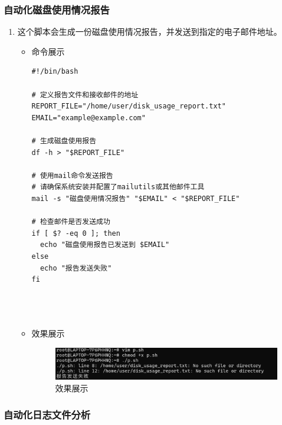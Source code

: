\documentclass[UTF8]{ctexart}
\begin{document}
\subsubsection{自动化磁盘使用情况报告}

\begin{enumerate}
  \item 这个脚本会生成一份磁盘使用情况报告，并发送到指定的电子邮件地址。

  \begin{itemize}
  \item 命令展示
  \begin{verbatim}
#!/bin/bash

# 定义报告文件和接收邮件的地址
REPORT_FILE="/home/user/disk_usage_report.txt"
EMAIL="example@example.com"

# 生成磁盘使用报告
df -h > "$REPORT_FILE"

# 使用mail命令发送报告
# 请确保系统安装并配置了mailutils或其他邮件工具
mail -s "磁盘使用情况报告" "$EMAIL" < "$REPORT_FILE"

# 检查邮件是否发送成功
if [ $? -eq 0 ]; then
  echo "磁盘使用报告已发送到 $EMAIL"
else
  echo "报告发送失败"
fi


    
  \end{verbatim}

  \item 效果展示
  \begin{figure}[H]
    \centering
    \includegraphics[width=\textwidth]{12} %
    \caption{效果展示}
  
  \end{figure}
\end{itemize}
\end{enumerate}
\subsubsection{自动化日志文件分析}
\end{document}
